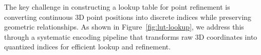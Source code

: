 

\label{sec:lut_construction}
The key challenge in constructing a lookup table for point refinement is converting continuous 3D point positions into discrete indices while preserving geometric relationships. As shown in Figure~\ref{fig:lut-lookup}, we address this through a systematic encoding pipeline that transforms raw 3D coordinates into quantized indices for efficient lookup and refinement.

